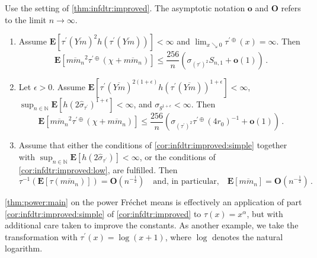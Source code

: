 \documentclass{article}
\newcommand*{\mo}[1]{\mathbf{#1}}
\newcommand{\N}{\mathbb{N}}
\newcommand{\lab}{\left[} %
\newcommand{\rab}{\right]} %
\newcommand{\ab}[1]{\lab #1 \rab} %
\newcommand{\abOf}[1]{\!\ab{#1}} %
\newcommand{\lb}{\left(} %
\newcommand{\rb}{\right)} %
\newcommand{\br}[1]{\lb #1 \rb} %
\newcommand{\brOf}[1]{\!\br{#1}} %
\newcommand{\E}{\mathbf{E}} %
\newcommand{\Eof}[1]{\E[#1]}
\newcommand{\EOf}[1]{\E\abOf{#1}}
\newcommand{\pr}{^\prime}
\newcommand{\eqfs}{\,.}
\newcommand{\ol}[2]{\overline{#1#2}}
\newcommand{\tran}{\tau}
\newcommand{\dtran}{\tau\pr}
\newcommand{\ddrtran}{\tau^{\prime\oplus}}
\begin{document}
\begin{corollary}\label{cor:infdtr:improved}
    Use the setting of \cref{thm:infdtr:improved}. The asymptotic notation $\mo o$ and $\mo O$ refers to the limit $n\to\infty$.
    \begin{enumerate}[label=(\roman*)]
        \item\label{cor:infdtr:improved:simple}
        Assume $\EOf{\dtran(\ol{Y}m)^{2} h(\dtran(\ol{Y}m))} < \infty$ and $\lim_{x\searrow0}\ddrtran(x) = \infty$.
        Then
        \begin{equation}
            \EOf{\ol m{m_n}^2  \ddrtran(\chi + \ol m{m_n})}
            \leq
            \frac{256}{n} \br{\sigma_{(\dtran)^{2}} S_{n,1} + \mathbf{o}(1)}
            \eqfs
        \end{equation}
        \item \label{cor:infdtr:improved:low}
        Let $\epsilon>0$.
        Assume
        $\EOf{\dtran(\ol{Y}m)^{2(1+\epsilon)} h(\dtran(\ol{Y}m))^{1+\epsilon}} < \infty$,
        $\sup_{n\in\N}\EOf{h(2\hat\sigma_{\dtran})^{1+\epsilon}} < \infty$,
        and $\sigma_{g^{1+\epsilon}} < \infty$.
        Then
        \begin{equation}
            \EOf{\ol m{m_n}^2  \ddrtran(\chi + \ol m{m_n})}
            \leq
            \frac{256}{n} \br{\sigma_{(\dtran)^2}\ddrtran(4r_0)^{-1} + \mathbf{o}(1)}
            \eqfs
        \end{equation}
        \item\label{cor:infdtr:improved:root}
        Assume that either the conditions of \ref{cor:infdtr:improved:simple} together with $\sup_{n\in\N}\Eof{h(2 \hat \sigma_{\dtran})}<\infty$, or the conditions of \ref{cor:infdtr:improved:low}, are fulfilled.
        Then
        \begin{equation}
            \tran^{-1}\brOf{\EOf{\tran(\ol m{m_n})}} = \mo O(n^{-\frac12})
            \quad\text{and, in particular,}\quad
            \EOf{\ol m{m_n}} = \mo O(n^{-\frac12})
            \eqfs
        \end{equation}
    \end{enumerate}
\end{corollary}
%
\cref{thm:power:main} on the power Fr\'echet means is effectively an application of part \ref{cor:infdtr:improved:simple} of \cref{cor:infdtr:improved} to $\tran(x)=x^\alpha$, but with additional care taken to improve the constants. As another example, we take the transformation with $\dtran(x) = \log(x+1)$, where $\log$ denotes the natural logarithm.
%
\end{document}
